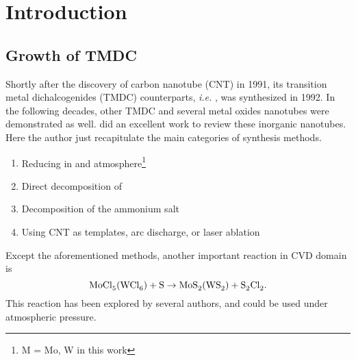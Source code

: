 \section{Introduction}
\subsection{Growth of TMDC}
Shortly after the discovery of carbon nanotube (CNT) in 1991,\cite{Iijima1991} its transition metal dichalcogenides (TMDC) counterparts, \emph{i.e.} , was synthesized in 1992.\cite{Tenne1992} In the following decades, other TMDC and several metal oxides nanotubes were demonstrated as well. \citeauthor{Rao2003} did an excellent work to review these inorganic nanotubes.\cite{Rao2003} Here the author just recapitulate the main categories of synthesis methods.
\begin{enumerate}
\item Reducing  in  and  atmosphere\footnote{M = Mo, W in this work}
\item Direct decomposition of 
\item Decomposition of the ammonium salt 
\item Using CNT as templates, arc discharge, or laser ablation
\end{enumerate}

Except the aforementioned methods, another important reaction in CVD domain is
\begin{equation}\label{eq:mclns}
\cee{MoCl5(WCl6) + S \rightarrow MoS2(WS2) + S2Cl2}.
\end{equation}
This reaction has been explored by several authors,\cite{Stoffels1999} and could be used under atmospheric pressure.\cite{Li2004a}

